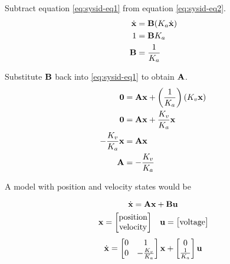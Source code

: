 Subtract equation \eqref{eq:sysid-eq1} from equation \eqref{eq:sysid-eq2}.
\begin{align*}
  \dot{\mathbf{x}} &= \mathbf{B} (K_a \dot{\mathbf{x}}) \\
  1 &= \mathbf{B} K_a \\
  \mathbf{B} &= \frac{1}{K_a}
\end{align*}

Substitute $\mathbf{B}$ back into \eqref{eq:sysid-eq1} to obtain $\mathbf{A}$.
\begin{align*}
  \mathbf{0} &= \mathbf{A}\mathbf{x} + \left(\frac{1}{K_a}\right)(K_v \mathbf{x}) \\
  \mathbf{0} &= \mathbf{A}\mathbf{x} + \frac{K_v}{K_a}\mathbf{x} \\
  -\frac{K_v}{K_a}\mathbf{x} &= \mathbf{A}\mathbf{x} \\
  \mathbf{A} &= -\frac{K_v}{K_a}
\end{align*}

A model with position and velocity states would be
\begin{theorem}
  \begin{equation*}
    \dot{\mathbf{x}} = \mathbf{A}\mathbf{x} + \mathbf{B}\mathbf{u}
  \end{equation*}
  \begin{equation*}
    \begin{array}{cc}
    \mathbf{x} =
      \begin{bmatrix}
        \text{position} \\
        \text{velocity}
      \end{bmatrix} &
    \mathbf{u} =
      \begin{bmatrix}
        \text{voltage}
      \end{bmatrix}
    \end{array}
  \end{equation*}
  \begin{equation}
    \dot{\mathbf{x}} =
      \begin{bmatrix}
        0 & 1 \\
        0 & -\frac{K_v}{K_a}
      \end{bmatrix}
      \mathbf{x} +
      \begin{bmatrix}
        0 \\
        \frac{1}{K_a}
      \end{bmatrix}
      \mathbf{u}
  \end{equation}
\end{theorem}
